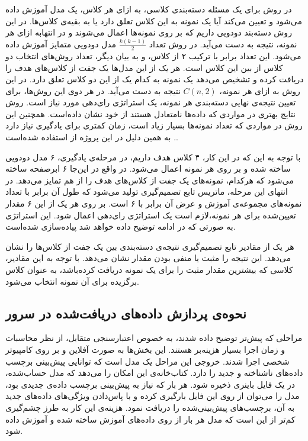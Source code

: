 در روش  برای یک مسئله دسته‌بندی  کلاسی،‌ به ازای هر کلاس، یک مدل  آموزش داده می‌شود و تعیین می‌کند آیا یک نمونه به این کلاس تعلق دارد یا به بقیه‌ی کلاس‌ها. در این روش  دسته‌بند دودویی داریم که بر روی نمونه‌ها اعمال می‌شوند و در انتهابه ازای هر نمونه،  نتیجه به دست می‌آید. 
در روش  تعداد $\frac{k(k-1)}{2}$ مدل  دودویی متمایز آموزش داده می‌شود. این تعداد برابر با ترکیب ۲ از  کلاس،‌ و به بیان دیگر، تعداد روش‌های انتخاب دو کلاس از بین این  کلاس است. هر یک از این مدل‌ها یک جفت از کلاس‌های هدف را دریافت کرده و تشخیص می‌دهد یک نمونه به کدام یک از این دو کلاس تعلق دارد. در این روش به ازای هر نمونه، $C(n, 2)$ نتیجه به دست می‌آید.
در هر دوی این روش‌ها، برای تعیین نتیجه‌ی نهایی دسته‌بندی هر نمونه، یک استراتژی رای‌دهی مورد نیاز است. روش  نتایج بهتری در مواردی که داده‌ها نامتعادل هستند از خود نشان داده‌است. همچنین این روش در مواردی که تعداد نمونه‌ها بسیار زیاد است،‌ زمان کمتری برای یادگیری نیاز دارد \cite{Mondejar}. به همین دلیل در این پروژه از  استفاده شده‌است.

با توجه به این که در این کار‌،‌ ۴ کلاس هدف داریم، در مرحله‌ی یادگیری‌، ۶ مدل دودویی ساخته شده و بر روی هر نمونه اعمال می‌شود. در واقع در این‌جا ۶ ابرصفحه ساخته می‌شود که هرکدام، نمونه‌های  یک جفت از کلاس‌های هدف را از هم تمایز می‌دهد. در انتهای این مرحله،‌ ماتریس تابع تصمیم‌گیری تولید می‌شود که طول آن برابر با تعداد نمونه‌های مجموعه‌ی آموزش و عرض آن برابر با ۶ است. بر روی هر یک از این ۶ مقدار تعیین‌شده برای هر نمونه،‌لازم است یک استراتژی رای‌دهی اعمال شود. این استراتژی به صورتی که در ادامه توضیح داده خواهد شد پیاده‌سازی شده‌است.

هر یک از مقادیر تابع تصمیم‌گیری نتیجه‌ی دسته‌بندی بین یک جفت از کلاس‌ها را نشان می‌دهد. این نتیجه را مثبت یا منفی بودن مقدار نشان می‌دهد. با توجه به این مقادیر، کلاسی که بیشترین مقدار مثبت را برای یک نمونه دریافت کرده‌باشد، به عنوان کلاس برگزیده برای آن نمونه انتخاب می‌شود. 

	\subsection{نحوه‌ی پردازش داده‌های دریافت‌شده در سرور}

مراحلی که پیش‌تر توضیح داده شدند، به خصوص اعتبارسنجی متقابل، از نظر محاسبات و زمان اجرا بسیار هزینه‌بر هستند. این بخش‌ها به صورت آفلاین و بر روی کامپیوتر شخصی اجرا شدند. خروجی این مراحل یک مدل  است که توانایی پیش‌بینی برچسب داده‌‌های ناشناخته و جدید را دارد. کتاب‌خانه‌ی  این امکان را می‌دهد که مدل  حساب‌شده، در یک فایل باینری ذخیره شود. هر بار که نیاز به پیش‌بینی برچسب داده‌ی جدیدی بود، مدل  را می‌توان از روی این فایل بارگیری کرده و با پاس‌دادن ویژگی‌های داده‌های جدید به آن، برچسب‌های پیش‌بینی‌شده را دریافت نمود. هزینه‌ی این کار به طرز چشم‌گیری کم‌تر از این است که مدل هر بار از روی داده‌های آموزش ساخته‌ شده و آموزش داده شود.

